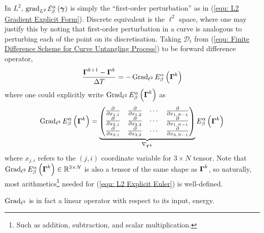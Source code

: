 \documentclass[../dissertation.tex]{subfiles}
\begin{document}
In $L^2$, $\operatorname{grad}_{L^2} \mathcal{E}_{\beta}^{\alpha} \left( \boldsymbol{\gamma} \right)$ is simply the ``first-order perturbation'' as in (\ref{equ: L2 Gradient Explicit Form}).
Discrete equivalent is the $\ell^2$ space,
where one may justify this by noting that first-order perturbation in a curve is analogous to perturbing each of the point on its discretisation.
Taking $\mathcal{D}_t$ from (\ref{equ: Finite Difference Scheme for Curve Untangling Process}) to be forward difference operator,
\begin{equation}
    \frac{\boldsymbol{\Gamma}^{k+1} - \boldsymbol{\Gamma}^k}{\Delta T} = - \operatorname{Grad}_{\ell^2} E_{\beta}^{\alpha} \left( \boldsymbol{\Gamma}^k \right)
    \label{equ: L2 Explicit Euler}
\end{equation}
where one could explicitly write $\operatorname{Grad}_{\ell^2} E_{\beta}^\alpha \left( \boldsymbol{\Gamma}^k \right)$ as
\begin{equation}
    \operatorname{Grad}_{\ell^2} E_{\beta}^\alpha \left( \boldsymbol{\Gamma}^k \right)
    =
    \underbrace{
        \begin{pmatrix}
            \frac{\partial}{\partial x_{1,1}} & \frac{\partial}{\partial x_{1,2}} & \cdots & \frac{\partial}{\partial x_{1,N-1}} \\
            \frac{\partial}{\partial x_{2,1}} & \frac{\partial}{\partial x_{2,2}} & \cdots & \frac{\partial}{\partial x_{1,N-1}} \\
            \frac{\partial}{\partial x_{3,1}} & \frac{\partial}{\partial x_{3,2}} & \cdots & \frac{\partial}{\partial x_{3,N-1}}
        \end{pmatrix}
    }_{\nabla_{\boldsymbol{\Gamma}^k}}
    E_{\beta}^{\alpha} \left( \boldsymbol{\Gamma}^k \right)
    \label{equ: Gradient in l2}
\end{equation}
where $x_{j,i}$ refers to the $\left( j,i \right)$ coordinate variable for $3 \times N$ tensor.
Note that $\operatorname{Grad}_{\ell^2} E_{\beta}^\alpha \left( \boldsymbol{\Gamma}^k \right) \in \mathbb{R}^{3 \times N}$ is also a tensor of the same shape as $\boldsymbol{\Gamma}^k$,
so naturally, most arithmetics\footnote{Such as addition, subtraction, and scalar multiplication.} needed for (\ref{equ: L2 Explicit Euler}) is well-defined.
\begin{remark}
    $\operatorname{Grad}_{\ell^2}$ is in fact a linear operator with respect to its input, energy.
\end{remark}
\end{document}
